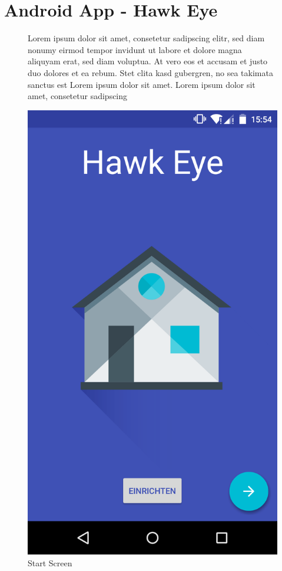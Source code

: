 \pagebreak
\section*{Android App - Hawk Eye}
\label{sec:manualAndroidApp}
\begin{figure}[htbp]
	\begin{minipage}{0.6\textwidth} 
Lorem ipsum dolor sit amet, consetetur sadipscing elitr, sed diam nonumy eirmod tempor invidunt ut labore et dolore magna aliquyam erat, sed diam voluptua. At vero eos et accusam et justo duo dolores et ea rebum. Stet clita kasd gubergren, no sea takimata sanctus est Lorem ipsum dolor sit amet. Lorem ipsum dolor sit amet, consetetur sadipscing 
	\end{minipage}
	\hfill
	\begin{minipage}{0.32\textwidth}
		\includegraphics[scale=0.12]{appendix/img/AppScreenshots/Screenshot1}
		\caption{Start Screen}
		\label{fig:screenshot_1}
	\end{minipage}
\end{figure}

